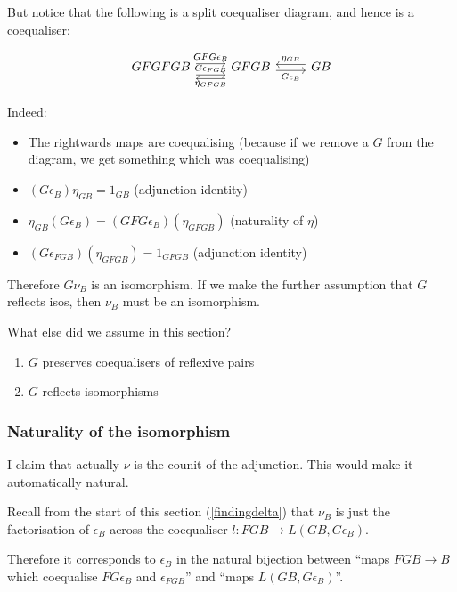 \documentclass[11pt]{amsart}
\begin{document}
But notice that the following is a split coequaliser diagram, and hence is a coequaliser:

\[
\begin{tikzcd}
GFGFGB
    \arrow[r, shift left=0.7ex, "GFG \epsilon_B"]
    \arrow[r, shift right=1.4ex, "G \epsilon_{FGB}"]
& GFGB
    \arrow[l, shift left=2.1ex, "\eta_{GFGB}"]
    \arrow[r, shift right, "G \epsilon_B"']
& GB
    \arrow[l, shift right, "\eta_{GB}"']
\end{tikzcd}
\]

Indeed:

\begin{itemize}
\item The rightwards maps are coequalising (because if we remove a $G$ from the diagram, we get something which was coequalising)
\item $(G \epsilon_B) \eta_{GB} = 1_{GB}$ (adjunction identity)
\item $\eta_{GB} (G \epsilon_B) = (GFG \epsilon_B)(\eta_{GFGB})$ (naturality of $\eta$)
\item $(G \epsilon_{FGB})(\eta_{GFGB}) = 1_{GFGB}$ (adjunction identity)
\end{itemize}

Therefore $G \nu_B$ is an isomorphism.
If we make the further assumption that $G$ reflects isos, then $\nu_B$ must be an isomorphism.

What else did we assume in this section?
\begin{enumerate}
\item $G$ preserves coequalisers of reflexive pairs
\item $G$ reflects isomorphisms
\end{enumerate}

\subsubsection{Naturality of the isomorphism}

I claim that actually $\nu$ is the counit of the adjunction.
This would make it automatically natural.

Recall from the start of this section (\ref{findingdelta}) that $\nu_B$ is just the factorisation of $\epsilon_B$ across the coequaliser $l: FGB \to L(GB, G \epsilon_B)$.

Therefore it corresponds to $\epsilon_B$ in the natural bijection between ``maps $FGB \to B$ which coequalise $FG \epsilon_B$ and $\epsilon_{FGB}$'' and ``maps $L(GB, G \epsilon_B)$''.
\end{document}
